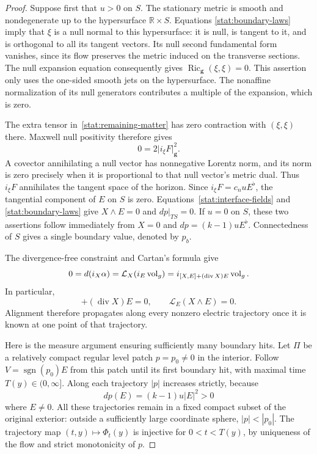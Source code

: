 \begin{proof}
Suppose first that $u>0$ on $S$.  The stationary metric is smooth and
nondegenerate up to the hypersurface $\mathbb R\times S$.  Equations
\eqref{stat:boundary-laws} imply that $\xi$ is a null normal to this
hypersurface: it is null, is tangent to it, and is orthogonal to all its
tangent vectors.  Its null second fundamental form vanishes, since its
flow preserves the metric induced on the transverse sections.  The
null expansion equation consequently gives
$\operatorname{Ric}_{\mathbf g}(\xi,\xi)=0$.  This assertion only uses
the one-sided smooth jets on the hypersurface.  The nonaffine
normalization of its null generators contributes a multiple of the
expansion, which is zero.

The extra tensor in~\eqref{stat:remaining-matter} has zero contraction
with $(\xi,\xi)$ there.  Maxwell null positivity therefore gives
\[
 0=2\lvert i_\xi F\rvert_{\mathbf g}^2.
\]
A covector annihilating a null vector has nonnegative Lorentz norm,
and its norm is zero precisely when it is proportional to that null
vector's metric dual.  Thus $i_\xi F$ annihilates the tangent space of
the horizon.  Since $i_\xi F=c_nuE^\flat$, the tangential component of
$E$ on $S$ is zero.  Equations~\eqref{stat:interface-fields} and
\eqref{stat:boundary-laws} give $X\wedge E=0$ and $dp|_{TS}=0$.
If $u=0$ on $S$, these two assertions follow immediately from $X=0$
and $dp=(k-1)uE^\flat$.  Connectedness of $S$ gives a single boundary
value, denoted by $p_b$.

The divergence-free constraint and Cartan's formula give
\[
 0=d(i_X\alpha)=\mathcal L_X(i_E\operatorname{vol}_g)
   =i_{[X,E]+(\operatorname{div}X)E}\operatorname{vol}_g.
\]
In particular,
\begin{equation}
 [X,E]+(\operatorname{div}X)E=0,
 \qquad \mathcal L_E(X\wedge E)=0.
 \label{stat:electric-bracket}
\end{equation}
Alignment therefore propagates along every nonzero electric
trajectory once it is known at one point of that trajectory.

Here is the measure argument ensuring sufficiently many boundary
hits.  Let $\Pi$ be a relatively compact regular level patch
$p=p_0\ne0$ in the interior.  Follow $V=\operatorname{sgn}(p_0)E$
from this patch until its first boundary hit, with maximal time
$T(y)\in(0,\infty]$.  Along each trajectory $|p|$ increases strictly,
because
\[
 dp(E)=(k-1)u|E|^2>0
\]
where $E\ne0$.  All these trajectories remain in a fixed compact
subset of the original exterior: outside a sufficiently large
coordinate sphere, $|p|<|p_0|$.  The trajectory map
$(t,y)\mapsto\Phi_t(y)$ is injective for $0<t<T(y)$, by uniqueness of
the flow and strict monotonicity of $p$.


\end{proof}
